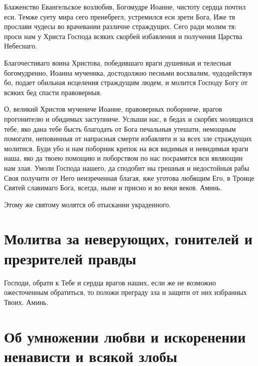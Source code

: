 Блаженство Евангельское возлюбив, Богомудре Иоанне, чистоту сердца почтил еси. Темже суету мира сего пренебрегл, устремился еси зрети Бога, Иже тя прослави чудесы во врачевании различне страждущих. Сего ради молим тя: проси нам у Христа Господа всяких скорбей избавления и получения Царства Небеснаго.




Благочестиваго воина Христова, победившаго враги душевныя и телесныя богомудренно, Иоанна мученика, достодолжно песньми восхвалим, чудодействуя бо, подает обильная исцеления страждущим людем, и молится Господу Богу от всяких бед спасти правоверныя.




О, великий Христов мучениче Иоанне, правоверных поборниче, врагов прогонителю и обидимых заступниче. Услыши нас, в бедах и скорбях молящихся тебе, яко дана тебе бысть благодать от Бога печальныя утешати, немощным помогати, неповинныя от напрасныя смерти избавляти и за всех зле страждущих молитися. Буди убо и нам поборник крепок на вся видимыя и невидимыя враги наша, яко да твоею помощию и поборством по нас посрамятся вси являющии нам злая. Умоли Господа нашего, да сподобит ны грешныя и недостойныя рабы Своя получити от Него неизреченная благая, яже уготова любящим Его, в Троице Святей славимаго Бога, всегда, ныне и присно и во веки веков. Аминь. 

\itshape 

Этому же святому молятся об отыскании украденного.\normalfont{}


\section{Молитва за неверующих, гонителей и презрителей правды}
 


Господи, обрати к Тебе и сердца врагов наших, если же не возможно ожесточенным обратиться, то положи преграду зла и защити от них избранных Твоих. Аминь.





\section{Об умножении любви и искоренении ненависти и всякой злобы}
 


